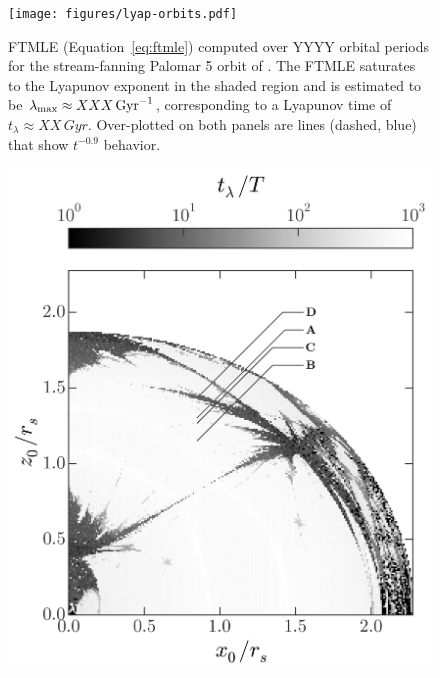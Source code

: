 \documentclass[letterpaper,12pt,preprint]{aastex}
\begin{document}
\begin{figure}[p]
\begin{center}
\texttt{[image: figures/lyap-orbits.pdf]}
\caption{ FTMLE (Equation~\ref{eq:ftmle}) computed over YYYY orbital periods for the stream-fanning Palomar 5 orbit of \cite{pearson15}. The FTMLE saturates to the Lyapunov exponent in the shaded region and is estimated to be $\lambda_{\rm max} \approx XXX \, {\rm Gyr}^{-1}$, corresponding to a Lyapunov time of $t_\lambda \approx XX \, {Gyr}$. Over-plotted on both panels are lines (dashed, blue) that show $t^{-0.9}$ behavior.} \label{fig:pal5}
\end{center}
\end{figure}

\begin{figure}[p]
\begin{center}
\includegraphics[width=\textwidth]{figures/lyap_map.png}
\caption{  } \label{fig:lyapmap} 
\end{center}
\end{figure}
%
\end{document}
